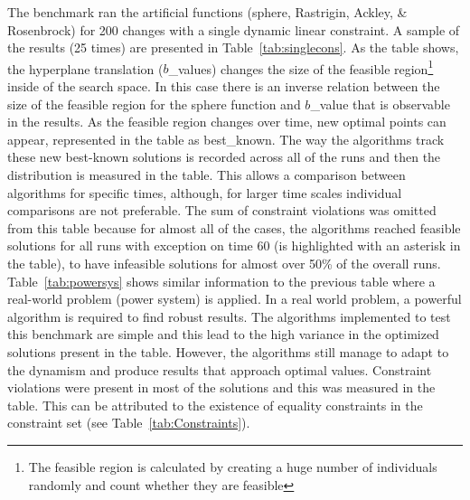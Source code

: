 \documentclass[review]{elsarticle}
\begin{document}
The benchmark ran the artificial functions (sphere, Rastrigin, Ackley, \& Rosenbrock) for 200 changes with a single dynamic linear constraint. A sample of the results (25 times) are presented in Table~\ref{tab:singlecons}. As the table shows, the hyperplane translation ($b$\_values) changes the size of the feasible region\footnote{The feasible region is calculated by creating a huge number of individuals randomly and count whether they are feasible} inside of the search space. In this case there is an inverse relation between the size of the feasible region for the sphere function and $b$\_value that is observable in the results. As the feasible region changes over time, new optimal points can appear, represented in the table as best\_known. The way the algorithms track these new best-known solutions is recorded across all of the runs and then the distribution is measured in the table. This allows a comparison between algorithms for specific times, although, for larger time scales individual comparisons are not preferable. The sum of constraint violations was omitted from this table because for almost all of the cases, the algorithms reached feasible solutions for all runs with exception on time 60 (is highlighted with an asterisk in the table), to have infeasible solutions for almost over 50\% of the overall runs.
Table~\ref{tab:powersys} shows similar information to the previous table where a real-world problem (power system) is applied. In a real world problem, a powerful algorithm is required to find robust results. The algorithms implemented to test this benchmark are simple and this lead to the high variance in the optimized solutions present in the table. However, the algorithms still manage to adapt to the dynamism and produce results that approach optimal values. Constraint violations were present in most of the solutions and this was measured in the table. This can be attributed to the existence of equality constraints in the constraint set (see Table~\ref{tab:Constraints}).
\end{document}
